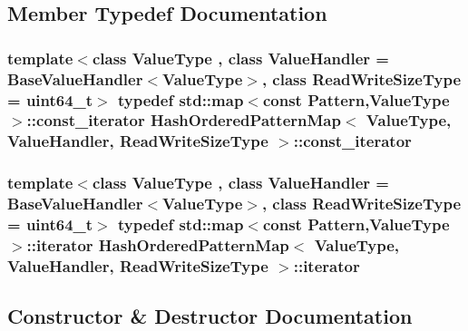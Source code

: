 \subsection{Member Typedef Documentation}
\hypertarget{classHashOrderedPatternMap_a0162fc35654440e11ea66e71e8ffe8f8}{}
\subsubsection[{const\+\_\+iterator}]{\setlength{\rightskip}{0pt plus 5cm}template$<$class Value\+Type , class Value\+Handler  = Base\+Value\+Handler$<$\+Value\+Type$>$, class Read\+Write\+Size\+Type  = uint64\+\_\+t$>$ typedef std\+::map$<$const {\bf Pattern},Value\+Type$>$\+::{\bf const\+\_\+iterator} {\bf Hash\+Ordered\+Pattern\+Map}$<$ Value\+Type, Value\+Handler, Read\+Write\+Size\+Type $>$\+::{\bf const\+\_\+iterator}}\label{classHashOrderedPatternMap_a0162fc35654440e11ea66e71e8ffe8f8}
\hypertarget{classHashOrderedPatternMap_a149481ae49379713dae0ffcaff294f65}{}
\subsubsection[{iterator}]{\setlength{\rightskip}{0pt plus 5cm}template$<$class Value\+Type , class Value\+Handler  = Base\+Value\+Handler$<$\+Value\+Type$>$, class Read\+Write\+Size\+Type  = uint64\+\_\+t$>$ typedef std\+::map$<$const {\bf Pattern},Value\+Type$>$\+::{\bf iterator} {\bf Hash\+Ordered\+Pattern\+Map}$<$ Value\+Type, Value\+Handler, Read\+Write\+Size\+Type $>$\+::{\bf iterator}}\label{classHashOrderedPatternMap_a149481ae49379713dae0ffcaff294f65}


\subsection{Constructor \& Destructor Documentation}
\hypertarget{classHashOrderedPatternMap_a8a1cb7250cb05276f9600af5283b376d}{}
